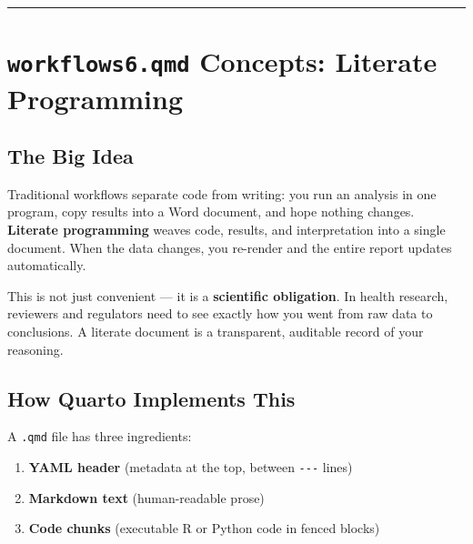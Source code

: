\documentclass[
  letterpaper,
  DIV=11,
  numbers=noendperiod,
  oneside]{scrreprt}
\providecommand{\tightlist}{%
  \setlength{\itemsep}{0pt}\setlength{\parskip}{0pt}}
\begin{document}
\begin{center}\rule{0.5\linewidth}{0.5pt}\end{center}

\section*{\texorpdfstring{\texttt{workflows6.qmd} Concepts: Literate
Programming}{workflows6.qmd Concepts: Literate Programming}}\label{workflows6.qmd-concepts-literate-programming}


\subsection*{The Big Idea}\label{the-big-idea}

Traditional workflows separate code from writing: you run an analysis in
one program, copy results into a Word document, and hope nothing
changes. \textbf{Literate programming} weaves code, results, and
interpretation into a single document. When the data changes, you
re-render and the entire report updates automatically.

This is not just convenient --- it is a \textbf{scientific obligation}.
In health research, reviewers and regulators need to see exactly how you
went from raw data to conclusions. A literate document is a transparent,
auditable record of your reasoning.

\subsection*{How Quarto Implements
This}\label{how-quarto-implements-this}

A \texttt{.qmd} file has three ingredients:

\begin{enumerate}
\def\labelenumi{\arabic{enumi}.}
\tightlist
\item
  \textbf{YAML header} (metadata at the top, between \texttt{-\/-\/-}
  lines)
\item
  \textbf{Markdown text} (human-readable prose)
\item
  \textbf{Code chunks} (executable R or Python code in fenced blocks)
\end{enumerate}
\end{document}
